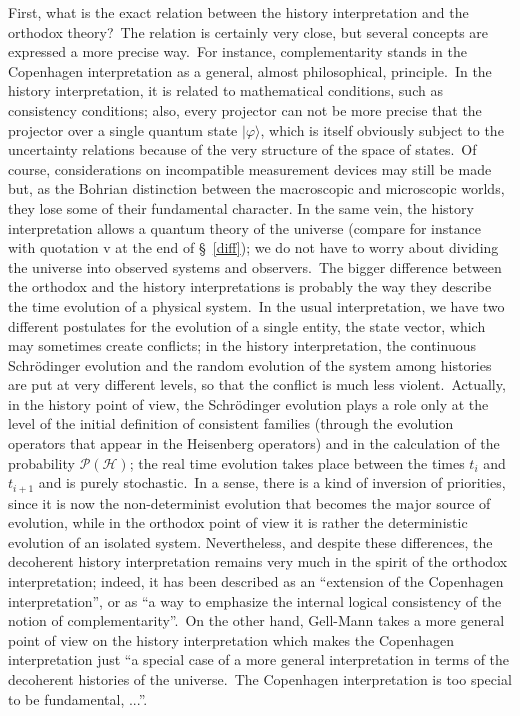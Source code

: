 \documentclass[12pt,onecolumn]{article}%
\begin{document}
First, what is the exact relation between the history interpretation and the
orthodox theory?\ The relation is certainly very close, but several concepts
are expressed a more precise way.\ For instance, complementarity stands in the
Copenhagen interpretation as a general, almost philosophical, principle.\ In
the history interpretation, it is related to mathematical conditions, such as
consistency conditions; also, every projector can not be more precise that the
projector over a single quantum state $|\varphi\rangle$, which is itself
obviously subject to the uncertainty relations because of the very structure
of the space of states.\ Of course, considerations on incompatible measurement
devices may still be made but, as the Bohrian distinction between the
macroscopic and microscopic worlds, they lose some of their fundamental
character. In the same vein, the history interpretation allows a quantum
theory of the universe (compare for instance with quotation v at the end of
\S \ \ref{diff}); we do not have to worry about dividing the universe into
observed systems and observers.\ The bigger difference between the orthodox
and the history interpretations is probably the way they describe the time
evolution of a physical system.\ In the usual interpretation, we have two
different postulates for the evolution of a single entity, the state vector,
which may sometimes create conflicts; in the history interpretation, the
continuous Schr\"{o}dinger evolution and the random evolution of the system
among histories are put at very different levels, so that the conflict is much
less violent.\ Actually, in the history point of view, the Schr\"{o}dinger
evolution plays a role only at the level of the initial definition of
consistent families (through the evolution operators that appear in the
Heisenberg operators) and in the calculation of the probability $\mathcal{P}%
\mathbb{(\mathcal{H})}$; the real time evolution takes place between the times
$t_{i}$ and $t_{i+1}$ and is purely stochastic.\ In a sense, there is a kind
of inversion of priorities, since it is now the non-determinist evolution that
becomes the major source of evolution, while in the orthodox point of view it
is rather the deterministic evolution of an isolated system. Nevertheless, and
despite these differences, the decoherent history interpretation remains very
much in the spirit of the orthodox interpretation; indeed, it has been
described as an ``extension of the Copenhagen interpretation'', or as ``a way
to emphasize the internal logical consistency of the notion of
complementarity''.\ On the other hand, Gell-Mann takes a more general point of
view on the history interpretation which makes the Copenhagen interpretation
just ``a special case of a more general interpretation in terms of the
decoherent histories of the universe.\ The Copenhagen interpretation is too
special to be fundamental, ...''\cite{reactions}.
\end{document}
